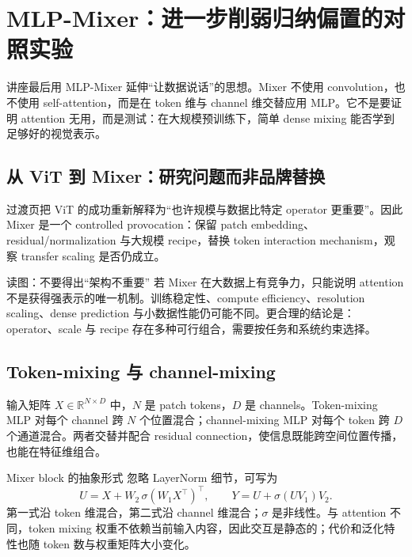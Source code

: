 \section{MLP-Mixer：进一步削弱归纳偏置的对照实验}

讲座最后用 MLP-Mixer 延伸“让数据说话”的思想。Mixer 不使用 convolution，也不使用 self-attention，而是在 token 维与 channel 维交替应用 MLP。它不是要证明 attention 无用，而是测试：在大规模预训练下，简单 dense mixing 能否学到足够好的视觉表示。

\subsection{从 ViT 到 Mixer：研究问题而非品牌替换}

过渡页把 ViT 的成功重新解释为“也许规模与数据比特定 operator 更重要”。因此 Mixer 是一个 controlled provocation：保留 patch embedding、residual/normalization 与大规模 recipe，替换 token interaction mechanism，观察 transfer scaling 是否仍成立。


\begin{knowledgebox}{读图：不要得出“架构不重要”}
若 Mixer 在大数据上有竞争力，只能说明 attention 不是获得强表示的唯一机制。训练稳定性、compute efficiency、resolution scaling、dense prediction 与小数据性能仍可能不同。更合理的结论是：operator、scale 与 recipe 存在多种可行组合，需要按任务和系统约束选择。
\end{knowledgebox}

\subsection{Token-mixing 与 channel-mixing}

输入矩阵 $X\in\mathbb{R}^{N\times D}$ 中，$N$ 是 patch tokens，$D$ 是 channels。Token-mixing MLP 对每个 channel 跨 $N$ 个位置混合；channel-mixing MLP 对每个 token 跨 $D$ 个通道混合。两者交替并配合 residual connection，使信息既能跨空间位置传播，也能在特征维组合。


\begin{importantbox}{Mixer block 的抽象形式}
忽略 LayerNorm 细节，可写为
\[
U=X+W_2\,\sigma(W_1X^{\top})^{\top},\qquad
Y=U+\sigma(UV_1)V_2.
\]
第一式沿 token 维混合，第二式沿 channel 维混合；$\sigma$ 是非线性。与 attention 不同，token mixing 权重不依赖当前输入内容，因此交互是静态的；代价和泛化特性也随 token 数与权重矩阵大小变化。
\end{importantbox}

